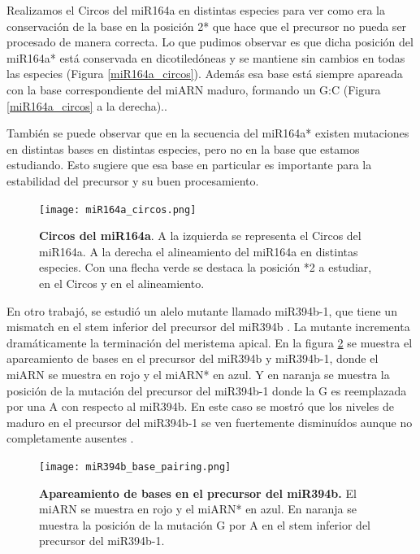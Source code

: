 Realizamos el Circos del miR164a en distintas especies para ver como era la conservación de la base en la posición 2* que hace que el precursor no pueda ser procesado de manera correcta.
Lo que pudimos observar es que dicha posición del miR164a* está conservada en dicotiledóneas y se mantiene sin cambios en todas las especies (Figura \ref{miR164a_circos}).
Además esa base está siempre apareada con la base correspondiente del miARN maduro, formando un G:C (Figura \ref{miR164a_circos} a la derecha)..

También se puede observar que en la secuencia del miR164a* existen mutaciones en distintas bases en distintas especies, pero no en la base que estamos estudiando.
Esto sugiere que esa base en particular es importante para la estabilidad del precursor y su buen procesamiento.

    \begin{figure}[htbp!] 
        \centering    
        \texttt{[image: miR164a\_circos.png]}
        \caption[Circos del miR164a]{
			\textbf{Circos del miR164a}.
			A la izquierda se representa el Circos del miR164a.
			A la derecha el alineamiento del miR164a en distintas especies. 
			Con una flecha verde se destaca la posición *2 a estudiar, en el Circos y en el alineamiento.
        }
        \label{fig:miR164a_circos}
    \end{figure}

En otro trabajó, se estudió un alelo mutante llamado miR394b-1, que tiene un mismatch en el stem inferior del precursor del miR394b \citep{pmid23333352}.
La mutante incrementa dramáticamente la terminación del meristema apical.   
En la figura \ref{fig:miR164_base_pairing} se muestra el apareamiento de bases en el precursor del miR394b y miR394b-1, donde el miARN se muestra en rojo y el miARN* en azul.
Y en naranja se muestra la posición de la mutación del precursor del miR394b-1 donde la G es reemplazada por una A con respecto al miR394b.
En este caso se mostró que los niveles de maduro en el precursor del miR394b-1 se ven fuertemente disminuídos aunque no completamente ausentes \citep{pmid23333352}. 

\begin{figure}[htbp!] 
	\centering    
	\texttt{[image: miR394b\_base\_pairing.png]}
	\caption[Apareamiento de bases en el precursor del miR394b]{
		\textbf{Apareamiento de bases en el precursor del miR394b.}
		El miARN se muestra en rojo y el miARN* en azul.
		En naranja se muestra la posición de la mutación G por A en el stem inferior del precursor del miR394b-1.
	}
	\label{fig:miR164_base_pairing}
\end{figure}


